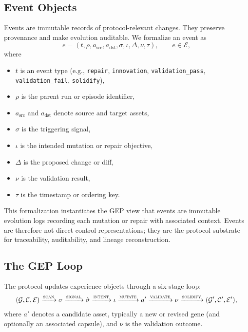 \documentclass{article}
\begin{document}
\subsection{Event Objects}
\label{app:gep_event}

Events are immutable records of protocol-relevant changes. 
They preserve provenance and make evolution auditable. 
We formalize an event as
\begin{equation}
e=(t,\rho,a_{\mathrm{src}},a_{\mathrm{dst}},\sigma,\iota,\Delta,\nu,\tau),
\qquad e\in\mathcal{E},
\end{equation}
where
\begin{itemize}
    \item $t$ is an event type (e.g., \texttt{repair}, \texttt{innovation}, \texttt{validation\_pass}, \texttt{validation\_fail}, \texttt{solidify}),
    \item $\rho$ is the parent run or episode identifier,
    \item $a_{\mathrm{src}}$ and $a_{\mathrm{dst}}$ denote source and target assets,
    \item $\sigma$ is the triggering signal,
    \item $\iota$ is the intended mutation or repair objective,
    \item $\Delta$ is the proposed change or diff,
    \item $\nu$ is the validation result,
    \item $\tau$ is the timestamp or ordering key.
\end{itemize}

This formalization instantiates the GEP view that events are immutable evolution logs recording each mutation or repair with associated context. 
Events are therefore not direct control representations; they are the protocol substrate for traceability, auditability, and lineage reconstruction.

\subsection{The GEP Loop}
\label{app:gep_loop}

The protocol updates experience objects through a six-stage loop:
\begin{equation}
(\mathcal{G},\mathcal{C},\mathcal{E}) 
\xrightarrow{\textsc{scan}} \sigma
\xrightarrow{\textsc{signal}} \hat{\sigma}
\xrightarrow{\textsc{intent}} \iota
\xrightarrow{\textsc{mutate}} a'
\xrightarrow{\textsc{validate}} \nu
\xrightarrow{\textsc{solidify}} (\mathcal{G}',\mathcal{C}',\mathcal{E}'),
\end{equation}
where $a'$ denotes a candidate asset, typically a new or revised gene (and optionally an associated capsule), and $\nu$ is the validation outcome.
\end{document}
